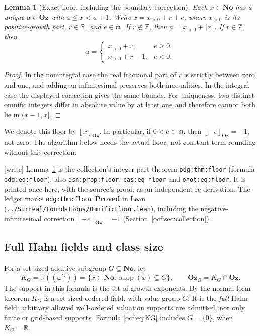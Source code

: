 \documentclass[11pt,a4paper]{article}
\numberwithin{equation}{section}
\newtheorem{lemma}[theorem]{Lemma}
\theoremstyle{definition}
\theoremstyle{remark}
\newcommand{\No}{\mathbf{No}}
\newcommand{\Oz}{\mathbf{Oz}}
\newcommand{\R}{\mathbb R}
\newcommand{\Z}{\mathbb Z}
\newcommand{\mm}{\mathfrak m}
\newcommand{\supp}{\operatorname{supp}}
\newcommand{\fl}[1]{\left\lfloor#1\right\rfloor_{\Oz}}
\newcommand{\rpath}[1]{\nolinkurl{#1}}%
\newcommand{\lbl}[1]{\nolinkurl{#1}}%
\newcommand{\wtag}{\textup{[write]}}%
\begin{document}
\begin{lemma}[Exact floor, including the boundary correction]
\label{ocf:lem:floor}
Each $x\in\No$ has a unique $a\in\Oz$ with $a\le x<a+1$. Write
$x=x_{>0}+r+e$, where $x_{>0}$ is its positive-growth part, $r\in\R$, and
$e\in\mm$. If $r\notin\Z$, then
$a=x_{>0}+\lfloor r\rfloor$. If $r\in\Z$, then
\[
 a=\begin{cases}x_{>0}+r,&e\ge0,\\
                 x_{>0}+r-1,&e<0.
   \end{cases}
\]
\end{lemma}
\begin{proof}
In the nonintegral case the real fractional part of $r$ is strictly between
zero and one, and adding an infinitesimal preserves both inequalities. In
the integral case the displayed correction gives the same bounds. For
uniqueness, two distinct omnific integers differ in absolute value by at
least one and therefore cannot both lie in $(x-1,x]$.
\end{proof}

We denote this floor by $\fl{x}$. In particular, if $0<e\in\mm$, then
$\fl{-e}=-1$, not zero. The algorithm below needs the actual floor, not
constant-term rounding without this correction.

\wtag{} Lemma~\ref{ocf:lem:floor} is the collection's integer-part
theorem \lbl{odg:thm:floor} (formula \lbl{odg:eq:floor}), also
\lbl{dsn:prop:floor}, \lbl{cas:eq-floor} and \lbl{onot:eq:floor}. It is
printed once here, with the source's proof, as an independent
re-derivation. The ledger marks \lbl{odg:thm:floor} \textbf{Proved} in Lean
(\rpath{../Surreal/Foundations/OmnificFloor.lean}), including the
negative-infinitesimal correction $\fl{-e}=-1$
(Section~\ref{ocf:sec:collection}).

\subsection{Full Hahn fields and class size}

For a set-sized additive subgroup $G\subseteq\No$, let
\begin{equation}\label{ocf:eq:KG}
 K_G=\R((\omega^G))
   =\{x\in\No:\supp(x)\subseteq G\},\qquad
 \Oz_G=K_G\cap\Oz.
\end{equation}
The support in this formula is the set of growth exponents. By the normal
form theorem $K_G$ is a set-sized ordered field, with value group $G$.
It is the \emph{full} Hahn field: arbitrary allowed well-ordered valuation
supports are admitted, not only finite or grid-based supports. Formula
\eqref{ocf:eq:KG} includes $G=\{0\}$, when $K_G=\R$.
\end{document}
